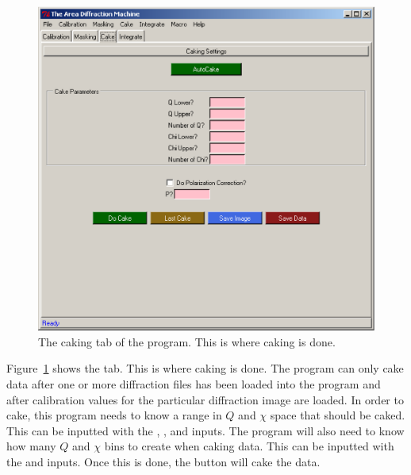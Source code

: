 \begin{figure}
    \centering
    \includegraphics[scale=.75]{figures/caking_tab.eps}
    \caption{The caking tab of the program. This is
    where caking is done.} 
    \label{caking_tab}
\end{figure}

Figure~\ref{caking_tab}
shows the  tab. This is where caking is done. 
The program can only cake data after one or more diffraction 
files has been loaded into the program and after calibration
values for the particular diffraction image are loaded.
In order to cake, this program needs to know a range
in $Q$ and $\chi$ space that should be caked. 
This can be inputted with the , 
, and  inputs.
The program will also need to know how many $Q$ and $\chi$ bins to 
create when caking data. This can be inputted
with the  and  inputs.
Once this is done, the  button will cake the data. 

